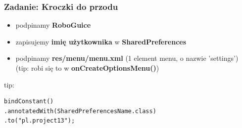 \begin{frame}[fragile]\frametitle{Zadanie: Kroczki do przodu}
\begin{itemize}
 \item podpinamy \textbf{RoboGuice}
 \item zapisujemy \textbf{imię użytkownika} w \textbf{SharedPreferences}
 \item podpinamy \textbf{res/menu/menu.xml} (1 element menu, o nazwie 'settings') (tip: robi się to w \textbf{onCreateOptionsMenu()})
\end{itemize} 

tip:
\begin{verbatim}
bindConstant()
.annotatedWith(SharedPreferencesName.class)
.to("pl.project13");
\end{verbatim}
\end{frame}





% 
